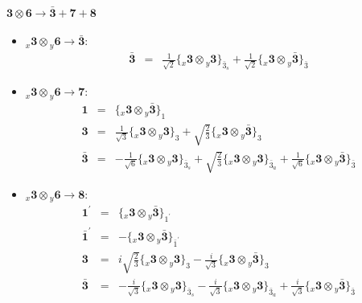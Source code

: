 \documentclass[english]{article}
\newcommand{\rep}[1]{\mathbf{#1}}
\newcommand{\repx}[2]{{}_{#2}\mathbf{#1}}
\newcommand{\subcg}[3]{\big\{ \repx{#1}{x}\otimes\repx{#2}{y}\big\}^{}_{#3}}
\begin{document}
\paragraph*{\Large $\rep{3}\otimes\rep{6}\to\rep{\bar{3}}+\rep{7}+\rep{8}$}
\begin{itemize}
\item $\repx{3}{x}\otimes\repx{6}{y}\to\rep{\bar{3}}$:
\begin{eqnarray*}
\rep{\bar{3}} &=& \frac{1}{\sqrt{2}}\subcg{3}{3}{\bar{3}_{s}}+\frac{1}{\sqrt{2}}\subcg{3}{\bar{3}}{\bar{3}}
\end{eqnarray*}
\item $\repx{3}{x}\otimes\repx{6}{y}\to\rep{7}$:
\begin{eqnarray*}
\rep{1} &=& \subcg{3}{\bar{3}}{1}
\\
\rep{3} &=& \frac{1}{\sqrt{3}}\subcg{3}{3}{3}+\sqrt{\frac{2}{3}}\subcg{3}{\bar{3}}{3}
\\
\rep{\bar{3}} &=& -\frac{1}{\sqrt{6}}\subcg{3}{3}{\bar{3}_{s}}+\sqrt{\frac{2}{3}}\subcg{3}{3}{\bar{3}_{a}}+\frac{1}{\sqrt{6}}\subcg{3}{\bar{3}}{\bar{3}}
\end{eqnarray*}
\item $\repx{3}{x}\otimes\repx{6}{y}\to\rep{8}$:
\begin{eqnarray*}
\rep{1^{\prime}} &=& \subcg{3}{\bar{3}}{1^{\prime}}
\\
\rep{\bar{1}^{\prime}} &=& -\subcg{3}{\bar{3}}{\bar{1}^{\prime}}
\\
\rep{3} &=& i \sqrt{\frac{2}{3}}\subcg{3}{3}{3}-\frac{i}{\sqrt{3}}\subcg{3}{\bar{3}}{3}
\\
\rep{\bar{3}} &=& -\frac{i}{\sqrt{3}}\subcg{3}{3}{\bar{3}_{s}}-\frac{i}{\sqrt{3}}\subcg{3}{3}{\bar{3}_{a}}+\frac{i}{\sqrt{3}}\subcg{3}{\bar{3}}{\bar{3}}
\end{eqnarray*}
\end{itemize}
\end{document}
